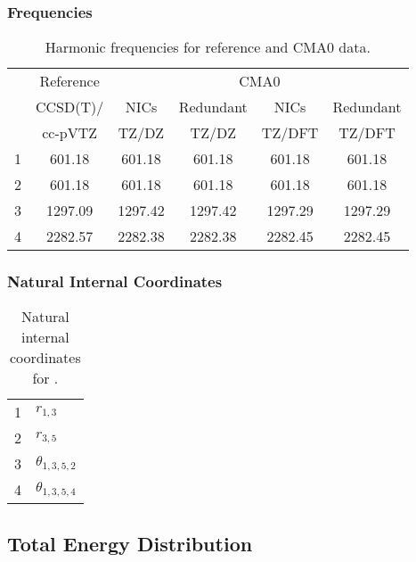 \documentclass[10pt,oneside]{article}
\begin{document}
\begin{table}[h!]
\subsubsection*{Frequencies}
\centering
\caption{Harmonic frequencies for reference and CMA0 data.}
\begin{tabular}{cccccc}
\toprule
{} & Reference & \multicolumn{4}{c}{CMA0} \\
{} &  CCSD(T)/ &    NICs &  Redundant &    NICs & Redundant \\
{} &   cc-pVTZ &   TZ/DZ &      TZ/DZ &  TZ/DFT &    TZ/DFT \\
\midrule
1 &    601.18 &  601.18 &     601.18 &  601.18 &    601.18 \\
2 &    601.18 &  601.18 &     601.18 &  601.18 &    601.18 \\
3 &   1297.09 & 1297.42 &    1297.42 & 1297.29 &   1297.29 \\
4 &   2282.57 & 2282.38 &    2282.38 & 2282.45 &   2282.45 \\
\bottomrule
\end{tabular}
\end{table}

\begin{table}[h!]
\subsubsection*{Natural Internal Coordinates}
\centering
\caption{Natural internal coordinates for .}
\small
\begin{tabular}{ll}
\toprule
  1   & $r_{1,3}$ \\
  2   & $r_{3,5}$ \\
  3   & $\theta_{1,3,5,2}$ \\
  4   & $\theta_{1,3,5,4}$ \\
\bottomrule
\end{tabular}
\end{table}

\begin{table}
\subsection*{Total Energy Distribution}
\centering\end{table}

\clearpage

\subsection{}
\end{document}
